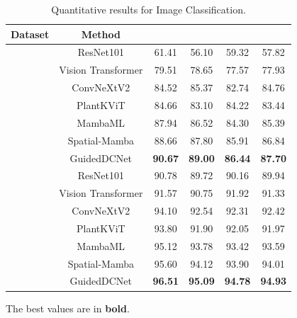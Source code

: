 \documentclass[a4paper,fleqn]{cas-sc}
\begin{document}
\begin{table}[!h]
\centering
\begin{threeparttable}
\caption{Quantitative results for Image Classification.}
\label{tab2}
\renewcommand{\arraystretch}{1.0}
\begin{tabular}{ c c c c c c }
\hline
\textbf{Dataset} & \textbf{Method} & \textbf{} & \textbf{} & \textbf{} & \textbf{} \\ 
\hline
{} 
& ResNet101 \cite{he2016deep} & 61.41 & 56.10 & 59.32 & 57.82 \\
& Vision Transformer \cite{dosovitskiy2021an} & 79.51 & 78.65 & 77.57 & 77.93 \\
& ConvNeXtV2 \cite{hieu2024nirsvit} & 84.52 & 85.37 & 82.74 & 84.76 \\
& PlantKViT \cite{van2023plantkvit} & 84.66 & 83.10 & 84.22 & 83.44 \\
& MambaML \cite{zhu2025mambaml} & 87.94 & 86.52 & 84.30 & 85.39 \\
& Spatial-Mamba \cite{xiao2025spatial} & 88.66 & 87.80 & 85.91 & 86.84 \\
& GuidedDCNet & \textbf{90.67} & \textbf{89.00} & \textbf{86.44} & \textbf{87.70} \\
\hline
{} 
& ResNet101 \cite{he2016deep} & 90.78 & 89.72 & 90.16 & 89.94 \\
& Vision Transformer \cite{dosovitskiy2021an} & 91.57 & 90.75 & 91.92 & 91.33 \\
& ConvNeXtV2 \cite{hieu2024nirsvit} & 94.10 & 92.54 & 92.31 & 92.42 \\
& PlantKViT \cite{van2023plantkvit} & 93.80 & 91.90 & 92.05 & 91.97 \\
& MambaML \cite{zhu2025mambaml} & 95.12 & 93.78 & 93.42 & 93.59 \\
& Spatial-Mamba \cite{xiao2025spatial} & 95.60 & 94.12 & 93.90 & 94.01 \\
& GuidedDCNet & \textbf{96.51} & \textbf{95.09} & \textbf{94.78} & \textbf{94.93} \\
\hline
\end{tabular}
\begin{tablenotes}
\footnotesize
\item The best values are in \textbf{bold}.
\end{tablenotes}
\end{threeparttable}
\end{table}
\end{document}
